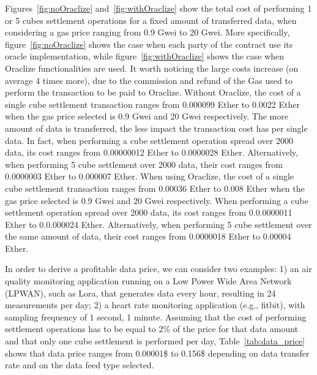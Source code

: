 Figures~\ref{fig:noOraclize} and~\ref{fig:withOraclize} show the total cost of performing 1 or 5 cubes settlement operations for a fixed amount of transferred data, when considering a gas price ranging from 0.9 Gwei to 20 Gwei.
More specifically, figure~\ref{fig:noOraclize} shows the case when each party of the contract use its oracle implementation, while figure~\ref{fig:withOraclize} shows the case when Oraclize functionalities are used. 
It worth noticing the large costs increase (on average 4 times more), due to the commission and refund of the Gas used to perform the transaction to be paid to Oraclize. 
Without Oraclize, the cost of a single cube settlement transaction ranges from 0.000099 Ether to 0.0022 Ether when the gas price selected is 0.9 Gwei and 20 Gwei respectively. The more amount of data is transferred, the less impact the transaction cost has per single data. In fact, when performing a cube settlement operation spread over 2000 data, its cost ranges from 0.00000012 Ether to 0.0000028 Ether. Alternatively, when performing 5 cube settlement over 2000 data, their cost ranges from 0.0000003 Ether to 0.000007 Ether.
When using Oraclize, the cost of a single cube settlement transaction ranges from 0.00036 Ether to 0.008 Ether when the gas price selected is 0.9 Gwei and 20 Gwei respectively. When performing a cube settlement operation spread over 2000 data, its cost ranges from 0.0.0000011 Ether to 0.0.000024 Ether. Alternatively, when performing 5 cube settlement over the same amount of data, their cost ranges from 0.0000018 Ether to 0.00004 Ether.

In order to derive a profitable data price, we can consider two examples: 1) an air quality monitoring application running on a Low Power Wide Area Network (LPWAN), such as Lora, that generates data every hour, resulting in 24 measurements per day; 2) a heart rate monitoring application (e.g., fitbit), with sampling frequency of 1 second, 1 minute.  
Assuming that the cost of performing settlement operations has to be equal to 2\% of the price for that data amount and that only one cube settlement is performed per day, Table~\ref{tab:data_price} shows that data price ranges from 0.00001\$ to 0.156\$ depending on data transfer rate and on the data feed type selected. 

